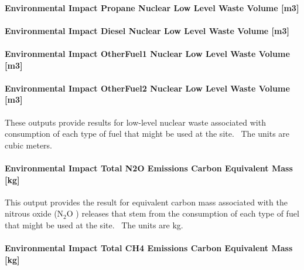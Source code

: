\paragraph{Environmental Impact Propane Nuclear Low Level Waste Volume {[}m3{]}}\label{environmental-impact-propane-nuclear-low-level-waste-volume-m3}

\paragraph{Environmental Impact Diesel Nuclear Low Level Waste Volume {[}m3{]}}\label{environmental-impact-diesel-nuclear-low-level-waste-volume-m3}

\paragraph{Environmental Impact OtherFuel1 Nuclear Low Level Waste Volume {[}m3{]}}\label{environmental-impact-otherfuel1-nuclear-low-level-waste-volume-m3}

\paragraph{Environmental Impact OtherFuel2 Nuclear Low Level Waste Volume {[}m3{]}}\label{environmental-impact-otherfuel2-nuclear-low-level-waste-volume-m3}

These outputs provide results for low-level nuclear waste associated with consumption of each type of fuel that might be used at the site.~ The units are cubic meters.

\paragraph{Environmental Impact Total N2O Emissions Carbon Equivalent Mass {[}kg{]}}\label{environmental-impact-total-n2o-emissions-carbon-equivalent-mass-kg}

This output provides the result for equivalent carbon mass associated with the nitrous oxide (N\(_{2}\)O ) releases that stem from the consumption of each type of fuel that might be used at the site.~ The units are kg.

\paragraph{Environmental Impact Total CH4 Emissions Carbon Equivalent Mass {[}kg{]}}\label{environmental-impact-total-ch4-emissions-carbon-equivalent-mass-kg}

